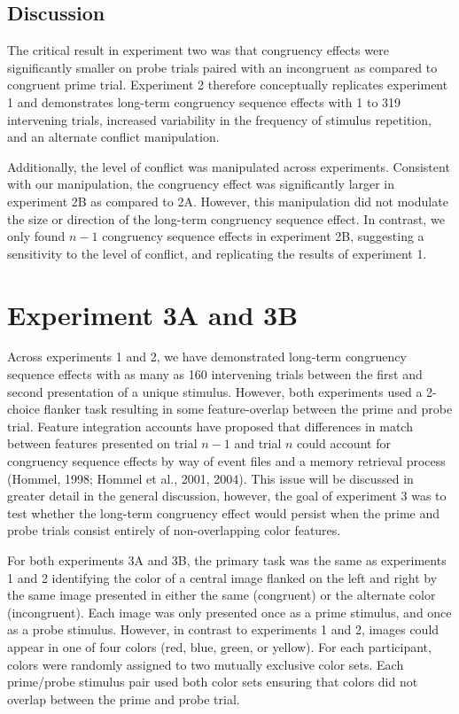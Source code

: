 \documentclass[]{DissertateCUNY}
\begin{document}
\hypertarget{discussion-5}{%
\subsection{Discussion}\label{discussion-5}}

The critical result in experiment two was that congruency effects were
significantly smaller on probe trials paired with an incongruent as
compared to congruent prime trial. Experiment 2 therefore conceptually
replicates experiment 1 and demonstrates long-term congruency sequence
effects with 1 to 319 intervening trials, increased variability in the
frequency of stimulus repetition, and an alternate conflict
manipulation.

Additionally, the level of conflict was manipulated across experiments.
Consistent with our manipulation, the congruency effect was
significantly larger in experiment 2B as compared to 2A. However, this
manipulation did not modulate the size or direction of the long-term
congruency sequence effect. In contrast, we only found \(n-1\)
congruency sequence effects in experiment 2B, suggesting a sensitivity
to the level of conflict, and replicating the results of experiment 1.

\hypertarget{experiment-3a-and-3b}{%
\section{Experiment 3A and 3B}\label{experiment-3a-and-3b}}

Across experiments 1 and 2, we have demonstrated long-term congruency
sequence effects with as many as 160 intervening trials between the
first and second presentation of a unique stimulus. However, both
experiments used a 2-choice flanker task resulting in some
feature-overlap between the prime and probe trial. Feature integration
accounts have proposed that differences in match between features
presented on trial \(n-1\) and trial \(n\) could account for congruency
sequence effects by way of event files and a memory retrieval process
(Hommel, 1998; Hommel et al., 2001, 2004). This issue will be discussed
in greater detail in the general discussion, however, the goal of
experiment 3 was to test whether the long-term congruency effect would
persist when the prime and probe trials consist entirely of
non-overlapping color features.

For both experiments 3A and 3B, the primary task was the same as
experiments 1 and 2 identifying the color of a central image flanked on
the left and right by the same image presented in either the same
(congruent) or the alternate color (incongruent). Each image was only
presented once as a prime stimulus, and once as a probe stimulus.
However, in contrast to experiments 1 and 2, images could appear in one
of four colors (red, blue, green, or yellow). For each participant,
colors were randomly assigned to two mutually exclusive color sets. Each
prime/probe stimulus pair used both color sets ensuring that colors did
not overlap between the prime and probe trial.
\end{document}

